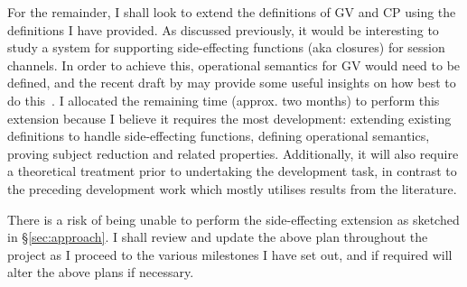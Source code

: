 \documentclass{mprop}
\begin{document}
For the remainder, I shall look to extend the definitions of GV and CP using
the definitions I have provided. As discussed previously, it would be
interesting to study a system for supporting side-effecting functions (aka
closures) for session channels. In order to achieve this, operational
semantics for GV would need to be defined, and the recent draft by
\citeauthor{Lindley:2014:SPS} may provide some useful insights on how best to
do this~\cite{Lindley:2014:SPS}. I allocated the remaining time (approx. two
months) to perform this extension because I believe it requires the most
development: extending existing definitions to handle side-effecting
functions, defining operational semantics, proving subject reduction and
related properties. Additionally, it will also require a theoretical treatment
prior to undertaking the development task, in contrast to the preceding
development work which mostly utilises results from the literature.

There is a risk of being unable to perform the side-effecting extension as
sketched in \S \ref{sec:approach}. I shall review and update the above plan
throughout the project as I proceed to the various milestones I have set out,
and if required will alter the above plans if necessary.


\printbibliography
\end{document}

